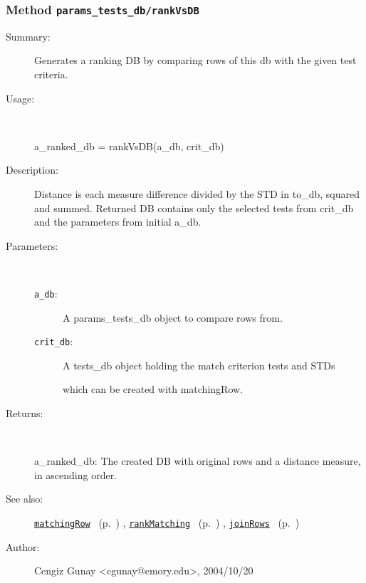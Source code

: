\subsubsection[Method \texttt{rankVsDB}]{Method \texttt{params\_tests\_db/rankVsDB}}%
%
\label{ref_params_tests_db__rankVsDB}%
\hypertarget{ref_params_tests_db__rankVsDB}{}%
\begin{description}
\item[Summary:]Generates a ranking DB by comparing rows of this db with the given test criteria.
%
\item[Usage:]~%
\begin{lyxcode}%
a\_ranked\_db = rankVsDB(a\_db, crit\_db)
%
\end{lyxcode}%
%
\item[Description:]%
Distance is each measure difference divided by the STD in to\_db, squared and
 summed. Returned DB contains only the selected tests from crit\_db and the parameters
 from initial a\_db.
\item[Parameters:]~
\begin{description}%
\item[\texttt{a\_db}:]
 A params\_tests\_db object to compare rows from.
\item[\texttt{crit\_db}:]
 A tests\_db object holding the match criterion tests and STDs

which can be created with matchingRow.\end{description}%
%
\item[Returns:]~

	a\_ranked\_db: The created DB with original rows and a distance measure, 
		   in ascending order. 
%
%
\item[See also:]%
\hyperlink{ref_matchingRow}{\texttt{matchingRow}}%
\ (p.~\pageref{ref_matchingRow})%
%
, \hyperlink{ref_rankMatching}{\texttt{rankMatching}}%
\ (p.~\pageref{ref_rankMatching})%
%
, \hyperlink{ref_joinRows}{\texttt{joinRows}}%
\ (p.~\pageref{ref_joinRows})%
%
%
\item[Author:]%
Cengiz Gunay <cgunay@emory.edu>, 2004/10/20%
\end{description}
\methodline%
